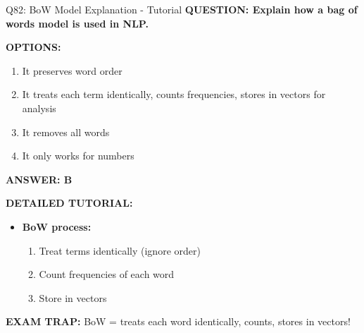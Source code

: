 \documentclass[8pt]{beamer}
\begin{document}
	\begin{frame}{Q82: BoW Model Explanation - Tutorial}
		\fontsize{6.5}{7.5}\selectfont
		\textbf{QUESTION: Explain how a bag of words model is used in NLP.}
		
		\vspace{0.1cm}
		\textbf{OPTIONS:}
		\begin{enumerate}
			\item It preserves word order
			\item It treats each term identically, counts frequencies, stores in vectors for analysis
			\item It removes all words
			\item It only works for numbers
		\end{enumerate}
		
		\vspace{0.1cm}
		\textcolor{myblue}{\textbf{ANSWER: B}}
		
		\vspace{0.1cm}
		\textbf{DETAILED TUTORIAL:}
		\begin{itemize}
			\item \textbf{BoW process:}
			\begin{enumerate}
				\item Treat terms identically (ignore order)
				\item Count frequencies of each word
				\item Store in vectors
			\end{enumerate}
		\end{itemize}
		
		\textcolor{myred}{\textbf{EXAM TRAP:}} BoW = \textcolor{myblue}{treats each word identically, counts, stores in vectors}!
	\end{frame}
	
\end{document}
